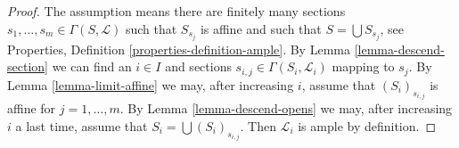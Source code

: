\documentclass[10pt,a4paper]{amsart}
\theoremstyle{plain}
\theoremstyle{definition}
\theoremstyle{remark}
\numberwithin{equation}{subsection}
\begin{document}
\begin{proof}
The assumption means there are finitely many sections
$s_1, \ldots, s_m \in \Gamma(S, \mathcal{L})$ such that
$S_{s_j}$ is affine and such that $S = \bigcup S_{s_j}$, see
Properties, Definition \ref{properties-definition-ample}.
By Lemma \ref{lemma-descend-section} we can find an $i \in I$
and sections $s_{i, j} \in \Gamma(S_i, \mathcal{L}_i)$ mapping to $s_j$.
By Lemma \ref{lemma-limit-affine} we may, after increasing $i$, assume
that $(S_i)_{s_{i, j}}$ is affine for $j = 1, \ldots, m$.
By Lemma \ref{lemma-descend-opens} we may, after increasing $i$ a
last time, assume that $S_i = \bigcup (S_i)_{s_{i, j}}$.
Then $\mathcal{L}_i$ is ample by definition.
\end{proof}
\end{document}
